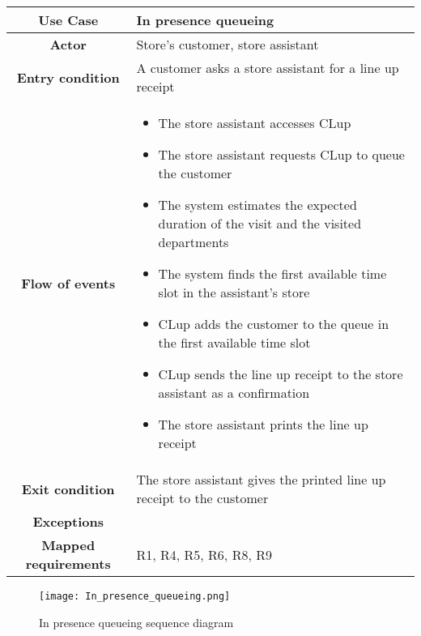 \documentclass[../../main.tex]{subfiles}
\begin{document}
      \begin{table}[H]
        \centering
          \begin{tabular}{c m{}}
          \hline
          \textbf{Use Case} & In presence queueing\\ \hline
          \textbf{Actor} & Store's customer, store assistant\\ \hline
          \textbf{Entry condition} & A customer asks a store assistant for a line up receipt\\  \hline
          \textbf{Flow of events} & \begin{itemize}
                                      \item The store assistant accesses CLup
                                      \item The store assistant requests CLup to queue the customer
                                      \item The system estimates the expected duration of the visit and the visited departments
                                      \item The system finds the first available time slot in the assistant's store
                                      \item CLup adds the customer to the queue in the first available time slot
                                      \item CLup sends the line up receipt to the store assistant as a confirmation
                                      \item The store assistant prints the line up receipt 
                                    \end{itemize}\\ \hline
          \textbf{Exit condition} & The store assistant gives the printed line up receipt to the customer\\ \hline
          \textbf{Exceptions} & \\ \hline
          \textbf{Mapped requirements} & R1, R4, R5, R6, R8, R9\\ \hline
          \end{tabular}
      \end{table}

      \begin{figure}[H]
        \centering
        \texttt{[image: In\_presence\_queueing.png]}
        \caption{In presence queueing sequence diagram}
      \end{figure}
\end{document}
